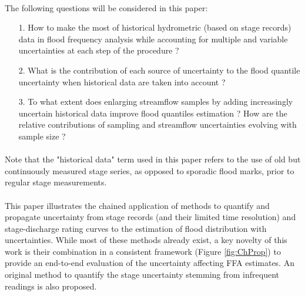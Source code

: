     \paragraph{}
    The following questions will be considered in this paper: 
    \begin{itemize}
        \item[1.] How to make the most of historical hydrometric (based on stage records) data in flood frequency analysis while accounting for multiple and variable uncertainties at each step of the procedure ? 
        
        \item[2.] What is the contribution of each source of uncertainty to the flood quantile uncertainty when historical data are taken into account ? 
        
        \item[3.] To what extent does enlarging streamflow samples by adding increasingly uncertain historical data improve flood quantiles estimation ? How are the relative contributions of sampling and streamflow uncertainties evolving with sample size ?
    \end{itemize}

    \paragraph{}
    Note that the "historical data" term used in this paper refers to the use of old but continuously measured stage series, as opposed to sporadic flood marks, prior to regular stage measurements. 

    \paragraph{}
    This paper illustrates the chained application of methods to quantify and propagate uncertainty from stage records (and their limited time resolution) and stage-discharge rating curves to the estimation of flood distribution with uncertainties. While most of these methods already exist, a key novelty of this work is their combination in a consistent framework (Figure \ref{fig:ChProp}) to provide an end-to-end evaluation of the  uncertainty affecting FFA estimates. An original method to quantify the stage uncertainty stemming from infrequent readings is also proposed.


